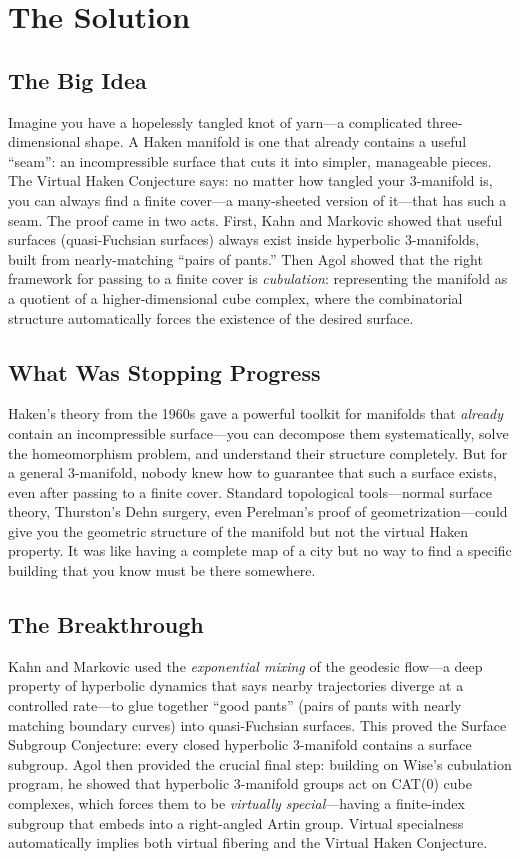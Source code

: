 \section{The Solution}

\subsection{The Big Idea}
Imagine you have a hopelessly tangled knot of yarn---a complicated three-dimensional shape. A Haken manifold is one that already contains a useful ``seam'': an incompressible surface that cuts it into simpler, manageable pieces. The Virtual Haken Conjecture says: no matter how tangled your 3-manifold is, you can always find a finite cover---a many-sheeted version of it---that has such a seam. The proof came in two acts. First, Kahn and Markovic showed that useful surfaces (quasi-Fuchsian surfaces) always exist inside hyperbolic 3-manifolds, built from nearly-matching ``pairs of pants.'' Then Agol showed that the right framework for passing to a finite cover is \emph{cubulation}: representing the manifold as a quotient of a higher-dimensional cube complex, where the combinatorial structure automatically forces the existence of the desired surface.

\subsection{What Was Stopping Progress}
Haken's theory from the 1960s gave a powerful toolkit for manifolds that \emph{already} contain an incompressible surface---you can decompose them systematically, solve the homeomorphism problem, and understand their structure completely. But for a general 3-manifold, nobody knew how to guarantee that such a surface exists, even after passing to a finite cover. Standard topological tools---normal surface theory, Thurston's Dehn surgery, even Perelman's proof of geometrization---could give you the geometric structure of the manifold but not the virtual Haken property. It was like having a complete map of a city but no way to find a specific building that you know must be there somewhere.

\subsection{The Breakthrough}
Kahn and Markovic used the \emph{exponential mixing} of the geodesic flow---a deep property of hyperbolic dynamics that says nearby trajectories diverge at a controlled rate---to glue together ``good pants'' (pairs of pants with nearly matching boundary curves) into quasi-Fuchsian surfaces. This proved the Surface Subgroup Conjecture: every closed hyperbolic 3-manifold contains a surface subgroup. Agol then provided the crucial final step: building on Wise's cubulation program, he showed that hyperbolic 3-manifold groups act on CAT(0) cube complexes, which forces them to be \emph{virtually special}---having a finite-index subgroup that embeds into a right-angled Artin group. Virtual specialness automatically implies both virtual fibering and the Virtual Haken Conjecture.

